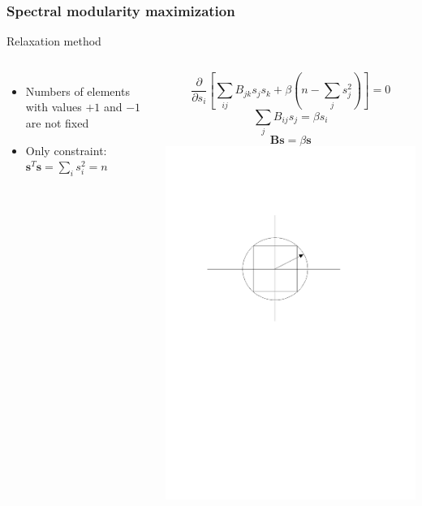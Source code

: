 \documentclass{beamer}
\begin{document}
\begin{frame}
    \frametitle{Spectral modularity maximization}
Relaxation method
    \begin{columns}
        \centering
        \begin{itemize}
        \setlength\itemsep{1em}
            \item{Numbers of elements with values $+1$ and $-1$ are not fixed}
            \item{Only constraint: ${\mathbf s}^T{\mathbf s} = \sum\limits_is_i^2 = n$}
        \end{itemize}

        $$\frac{\partial}{\partial s_i}\left[\sum\limits_{ij}B_{jk}s_js_k + \beta\left(n-\sum\limits_{j}s_j^2\right)\right] = 0$$
        $$\sum\limits_jB_{ij}s_j=\beta s_i$$ 
        $${\mathbf B}{\mathbf s} = \beta {\mathbf s}$$
        \centering
        \includegraphics[width=0.8\columnwidth, trim = 100 200 100 100, clip = true]{hypercube.pdf}

    \end{columns}

\end{frame}
\end{document}
